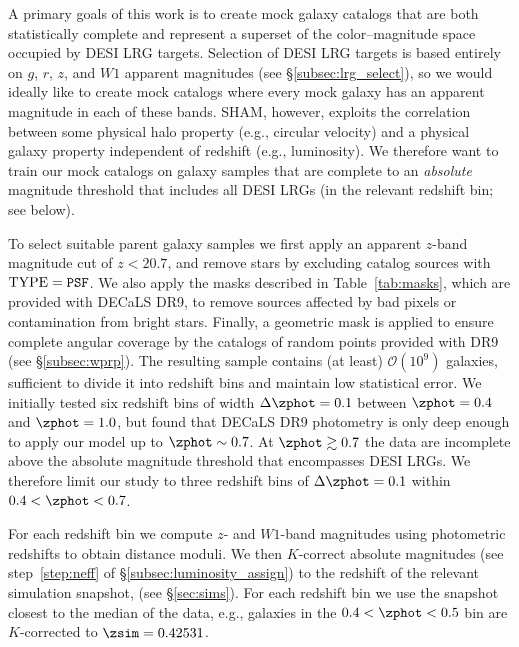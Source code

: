 \documentclass[twocolumn,apj,iop,tighten]{emulateapj2}
\begin{document}
A primary goals of this work is to create mock galaxy catalogs that are both statistically complete and represent a superset of the color--magnitude space occupied by DESI LRG targets. Selection of DESI LRG targets is based entirely on $g$, $r$, $z$, and $W1$ apparent magnitudes (see \S\ref{subsec:lrg_select}), so we would ideally like to create mock catalogs where every mock galaxy has an apparent magnitude in each of these bands. SHAM, however, exploits the correlation between some physical halo property (e.g., circular velocity) and a physical galaxy property independent of redshift (e.g., luminosity). We therefore want to train our mock catalogs on galaxy samples that are complete to an \emph{absolute} magnitude threshold that includes all DESI LRGs (in the relevant redshift bin; see below).

To select suitable parent galaxy samples we first apply an apparent $z$-band magnitude cut of $z < 20.7$, and remove stars by excluding catalog sources with ${\rm TYPE} = \texttt{PSF}$. We also apply the masks described in Table~\ref{tab:masks}, which are provided with DECaLS DR9, to remove sources affected by bad pixels or contamination from bright stars. Finally, a geometric mask is applied to ensure complete angular coverage by the catalogs of random points provided with DR9 (see \S\ref{subsec:wprp}). The resulting sample contains (at least) $\mathcal{O}(10^9)$ galaxies, sufficient to divide it into redshift bins and maintain low statistical error. We initially tested six redshift bins of width $\Delta\zphot=0.1$ between $\zphot=0.4$ and $\zphot=1.0$, but found that DECaLS DR9 photometry is only deep enough to apply our model up to $\zphot \sim 0.7$. At $\zphot \gtrsim 0.7$ the data are incomplete above the absolute magnitude threshold that encompasses DESI LRGs. We therefore limit our study to three redshift bins of $\Delta\zphot=0.1$ within $0.4 < \zphot < 0.7$.

For each redshift bin we compute $z$- and $W1$-band magnitudes using \citet{zhou_etal20b} photometric redshifts to obtain distance moduli. We then $K$-correct absolute magnitudes (see step~\ref{step:neff} of \S\ref{subsec:luminosity_assign}) to the redshift of the relevant simulation snapshot, \zsim (see \S\ref{sec:sims}). For each redshift bin we use the snapshot closest to the median \zphot of the data, e.g., galaxies in the ${0.4 < \zphot < 0.5}$ bin are $K$-corrected to $\zsim=0.42531$.
\end{document}
